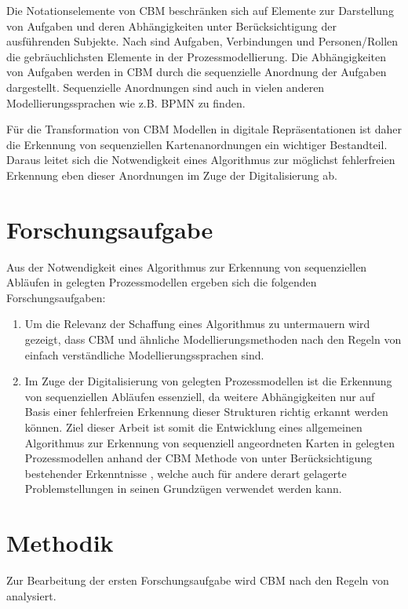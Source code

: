 Die Notationselemente von CBM beschränken sich auf Elemente zur Darstellung von Aufgaben und deren Abhängigkeiten unter Berücksichtigung der ausführenden Subjekte. Nach \citet{Muehlen2013} sind Aufgaben, Verbindungen und Personen/Rollen die gebräuchlichsten Elemente in der Prozessmodellierung. Die Abhängigkeiten von Aufgaben werden in CBM durch die sequenzielle Anordnung der Aufgaben dargestellt. Sequenzielle Anordnungen sind auch in vielen anderen Modellierungssprachen wie z.B. BPMN zu finden.

Für die Transformation von CBM Modellen in digitale Repräsentationen ist daher die Erkennung von sequenziellen Kartenanordnungen ein wichtiger Bestandteil. Daraus leitet sich die Notwendigkeit eines Algorithmus zur möglichst fehlerfreien Erkennung eben dieser Anordnungen im Zuge der Digitalisierung ab.

\section{Forschungsaufgabe} %
\label{sec:forschungsaufgabe}
Aus der Notwendigkeit eines Algorithmus zur Erkennung von sequenziellen Abläufen in gelegten Prozessmodellen ergeben sich die folgenden Forschungsaufgaben:

\begin{enumerate}
	\item Um die Relevanz der Schaffung eines Algorithmus zu untermauern wird gezeigt, dass CBM und ähnliche Modellierungsmethoden nach den Regeln von \citet{MENDLING2010127} einfach verständliche Modellierungssprachen sind.
	\item Im Zuge der Digitalisierung von gelegten Prozessmodellen ist die Erkennung von sequenziellen Abläufen essenziell, da weitere Abhängigkeiten nur auf Basis einer fehlerfreien Erkennung dieser Strukturen richtig erkannt werden können. Ziel dieser Arbeit ist somit die Entwicklung eines allgemeinen Algorithmus zur Erkennung von sequenziell angeordneten Karten in gelegten Prozessmodellen anhand der CBM Methode  von \citet{oppl2016linking} unter Berücksichtigung bestehender Erkenntnisse \cite{max}, welche auch für andere derart gelagerte Problemstellungen in seinen Grundzügen verwendet werden kann.
\end{enumerate}

\section{Methodik} %
\label{sec:methodik}
Zur Bearbeitung der ersten Forschungsaufgabe wird CBM nach den Regeln von \citet{MENDLING2010127} analysiert.

